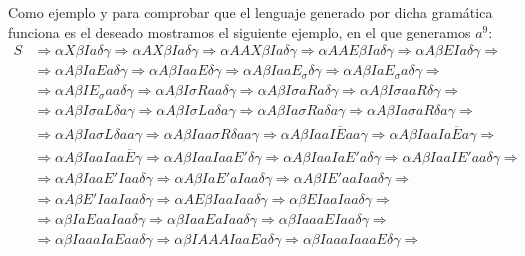 \begin{ejercicio}
\begin{enumerate}
            Como ejemplo y para comprobar que el lenguaje generado por dicha gramática funciona es el deseado mostramos el siguiente ejemplo, en el que generamos $a^9$:
            \begin{align*}
                S &\Rightarrow \alpha X \beta I a \delta\gamma \Rightarrow \alpha AX\beta Ia\delta\gamma \Rightarrow \alpha AAX\beta Ia\delta\gamma \Rightarrow \alpha AAE \beta Ia \delta\gamma \Rightarrow \alpha A \beta E Ia\delta\gamma \Rightarrow \\
                  &\Rightarrow \alpha A\beta IaEa\delta\gamma \Rightarrow \alpha A\beta IaaE\delta\gamma \Rightarrow \alpha A\beta IaaE_{\sigma}\delta\gamma \Rightarrow \alpha A\beta IaE_{\sigma}a\delta\gamma \Rightarrow \\ 
                  &\Rightarrow\alpha A\beta IE_{\sigma}aa\delta\gamma \Rightarrow \alpha A\beta I\sigma Raa\delta\gamma \Rightarrow \alpha A\beta I \sigma aRa \delta\gamma \Rightarrow \alpha A \beta I \sigma aaR \delta\gamma\Rightarrow \\
                  &\Rightarrow \alpha A\beta I\sigma aL\delta a\gamma \Rightarrow \alpha A \beta I\sigma L a\delta a\gamma \Rightarrow \alpha A \beta I a\sigma R a \delta a\gamma  \Rightarrow \alpha A \beta Ia\sigma aR\delta a\gamma \Rightarrow \\
                  &\Rightarrow \alpha A \beta I a\sigma L\delta aa \gamma \Rightarrow \alpha A \beta Iaa \sigma R \delta aa \gamma \Rightarrow \alpha A\beta IaaI\overline{E}aa\gamma \Rightarrow \alpha A \beta IaaIa\overline{E}a\gamma \Rightarrow \\
                  &\Rightarrow \alpha A\beta IaaIaa\overline{E} \gamma \Rightarrow \alpha A \beta IaaIaaE'\delta \gamma \Rightarrow \alpha A\beta IaaIaE'a\delta\gamma \Rightarrow \alpha A\beta IaaIE'aa\delta\gamma \Rightarrow \\
                  &\Rightarrow \alpha A\beta IaaE'Iaa\delta\gamma \Rightarrow \alpha A \beta IaE'aIaa\delta\gamma \Rightarrow \alpha A\beta IE'aaIaa\delta\gamma \Rightarrow \\
                  &\Rightarrow \alpha A \beta E'IaaIaa\delta\gamma \Rightarrow \alpha AE\beta IaaIaa\delta\gamma \Rightarrow \alpha \beta E IaaIaa\delta \gamma \Rightarrow \\
                  &\Rightarrow \alpha\beta IaEaaIaa\delta\gamma\Rightarrow \alpha\beta IaaEaIaa\delta\gamma\Rightarrow\alpha\beta IaaaEIaa\delta\gamma\Rightarrow \\
                  &\Rightarrow \alpha\beta IaaaIaEaa\delta\gamma\Rightarrow\alpha\beta IAAAIaaEa\delta\gamma\Rightarrow \alpha\beta IaaaIaaaE\delta\gamma\Rightarrow \\

\end{align*}
\end{enumerate}
\end{ejercicio}

